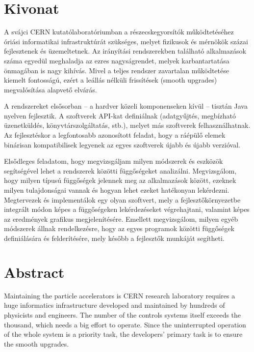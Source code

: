 \chapter*{Kivonat}

A svájci CERN kutatólaboratóriumban a részecskegyorsítók működtetéséhez óriási
informatikai infrastruktúrát szükséges, melyet fizikusok és mérnökök százai
fejlesztenek és üzemeltetnek. Az irányítási rendszerekben található
alkalmazások száma egyedül meghaladja az ezres nagyságrendet, melyek
karbantartatása önmagában is nagy kihívás. Mivel a teljes rendszer zavartalan
működtetése kiemelt fontosságú, ezért a leállás nélküli frissítések (smooth
upgrades) megvalósítása alapvető elvárás.

A rendszereket elsősorban – a hardver közeli komponenseken kívül – tisztán Java
nyelven fejlesztik. A szoftverek API-kat definiálnak (adatgyűjtés, megbízható
üzenetküldés, könyvtárszolgáltatás, stb.), melyet más szoftverek
felhasználhatnak. Az fejlesztéskor a legfontosabb azonosított feladat, hogy a
ráépülő elemek binárisan kompatibilisek le\-gye\-nek az egyes szoftverek újabb
és újabb verzióval.

Elsődleges feladatom, hogy megvizsgáljam milyen módszerek és eszközök
segítségé\-vel lehet a rendszerek közötti függőségeket analizálni. Megvizsgálom,
hogy milyen típusú függőségek jelennek meg az alkalmazások között, ezeknek
milyen tulajdonságai vannak és hogyan lehet ezeket hatékonyan lekérdezni.
Megtervezek és implementálok egy olyan szoftvert, mely a fejlesztőkörnyezetbe
integrált módon képes a függőségeken lekérdezéseket végrehajtani, valamint
képes az eredmények grafikus megjelenítésére. E\-mel\-lett megvizsgálom, milyen
egyéb módszerek állnak rendelkezésre, hogy az egyes programok közötti
függőségek definiálására és felderítésére, mely később a fejlesztők mun\-ká\-ját
segítheti.
\vfill

\chapter*{Abstract}
Maintaining the particle accelerators is CERN research laboratory requires a
huge informatics infrastructure developed and maintained by hundreds of
physicists and engineers. The number of the controls systems itself exceeds the
thousand, which needs a big effort to operate. Since the uninterrupted
operation of the whole system is a priority task, the developers' primary task
is to ensure the smooth upgrades.

